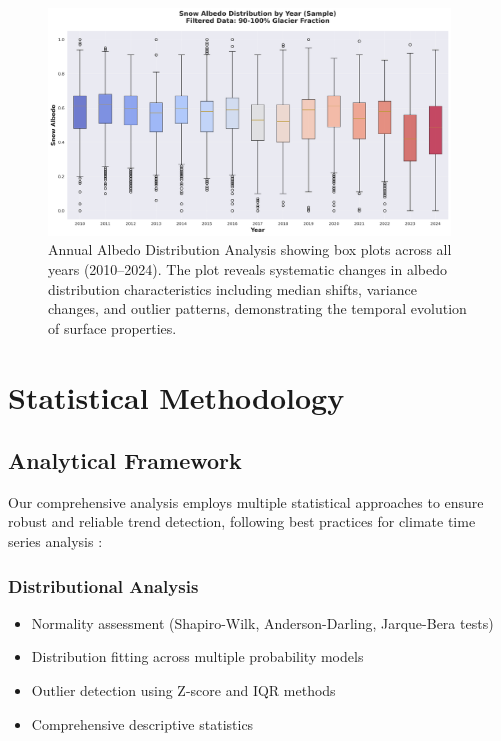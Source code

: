 \documentclass[12pt,a4paper]{article}
\begin{document}
\begin{figure}[H]
\centering
\includegraphics[width=0.95\textwidth]{../../results/plots/distribution_all_years.png}
\caption{Annual Albedo Distribution Analysis showing box plots across all years (2010--2024). The plot reveals systematic changes in albedo distribution characteristics including median shifts, variance changes, and outlier patterns, demonstrating the temporal evolution of surface properties.}
\label{fig:annual_distributions}
\end{figure}

\section{Statistical Methodology}

\subsection{Analytical Framework}

Our comprehensive analysis employs multiple statistical approaches to ensure robust and reliable trend detection, following best practices for climate time series analysis \cite{Hassan2020ChangePointClimate, Pinzon2016STLRemote}:

\subsubsection{Distributional Analysis}
\begin{itemize}
    \item Normality assessment (Shapiro-Wilk, Anderson-Darling, Jarque-Bera tests)
    \item Distribution fitting across multiple probability models
    \item Outlier detection using Z-score and IQR methods
    \item Comprehensive descriptive statistics
\end{itemize}
\end{document}
